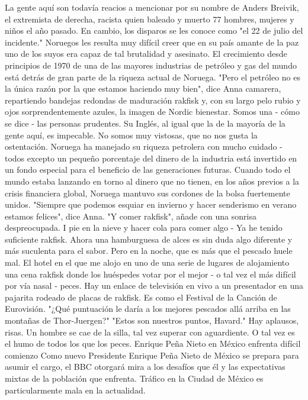 La gente aquí son todavía reacios a mencionar por su nombre de Anders Breivik, el extremista de derecha, racista quien baleado y muerto 77 hombres, mujeres y niños el año pasado.
En cambio, los disparos se les conoce como "el 22 de julio del incidente."
Noruegos les resulta muy difícil creer que en su país amante de la paz uno de los suyos era capaz de tal brutalidad y asesinato.
El crecimiento desde principios de 1970 de una de las mayores industrias de petróleo y gas del mundo está detrás de gran parte de la riqueza actual de Noruega.
"Pero el petróleo no es la única razón por la que estamos haciendo muy bien", dice Anna camarera, repartiendo bandejas redondas de maduración rakfisk y, con su largo pelo rubio y ojos sorprendentemente azules, la imagen de Nordic bienestar.
Somos una - cómo se dice - las personas prudentes.
Su Inglés, al igual que la de la mayoría de la gente aquí, es impecable.
No somos muy vistosas, que no nos gusta la ostentación.
Noruega ha manejado su riqueza petrolera con mucho cuidado - todos excepto un pequeño porcentaje del dinero de la industria está invertido en un fondo especial para el beneficio de las generaciones futuras.
Cuando todo el mundo estaba lanzando en torno al dinero que no tienen, en los años previos a la crisis financiera global, Noruega mantuvo sus cordones de la bolsa fuertemente unidos.
"Siempre que podemos esquiar en invierno y hacer senderismo en verano estamos felices", dice Anna.
"Y comer rakfisk", añade con una sonrisa despreocupada.
I pie en la nieve y hacer cola para comer algo - Ya he tenido suficiente rakfisk.
Ahora una hamburguesa de alces es sin duda algo diferente y más suculenta para el sabor.
Pero en la noche, que es más que el pescado huele mal.
El hotel en el que me alojo en uno de una serie de lugares de alojamiento una cena rakfisk donde los huéspedes votar por el mejor - o tal vez el más difícil por vía nasal - peces.
Hay un enlace de televisión en vivo a un presentador en una pajarita rodeado de placas de rakfisk.
Es como el Festival de la Canción de Eurovisión.
"¿Qué puntuación le daría a los mejores pescados allá arriba en las montañas de Thor-Juergen?"
"Estos son nuestros puntos, Havard."
Hay aplausos, risas.
Un hombre se cae de la silla, tal vez superar con aguardiente.
O tal vez es el humo de todos los que los peces.
Enrique Peña Nieto en México enfrenta difícil comienzo
Como nuevo Presidente Enrique Peña Nieto de México se prepara para asumir el cargo, el BBC otorgará mira a los desafíos que él y las expectativas mixtas de la población que enfrenta.
Tráfico en la Ciudad de México es particularmente mala en la actualidad.
